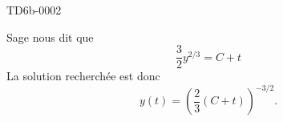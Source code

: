 \begin{corrige}{TD6b-0002}
\begin{enumerate}
            Sage nous dit que
            \begin{equation}
                \frac{ 3 }{2}y^{2/3}=C+t
            \end{equation}
            La solution recherchée est donc
            \begin{equation}
                y(t)=\left( \frac{ 2 }{ 3 }(C+t) \right)^{-3/2}.
            \end{equation}
            
    \end{enumerate}

\end{corrige}
